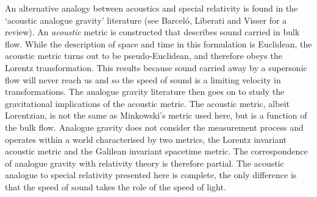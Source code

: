 \documentclass[10pt, fleqn,final,showtrims,oldfontcommands, article,a4paper,oneside]{memoir} %
\begin{document}
An alternative  analogy between acoustics and special relativity is found in the `acoustic analogue gravity' literature (see Barcel{\'o}, Liberati and Visser\cite{Barcelo2005} for a review).
An {\em acoustic} metric is constructed that describes sound carried in bulk flow.
While the description of space and time in this formulation is Euclidean, the acoustic metric turns out to be pseudo-Euclidean,
and therefore obeys the Lorentz transformation.
This results because  sound carried away by a supersonic flow will never reach us
and so the speed of sound is a limiting velocity in transformations.
The analogue gravity literature then goes on to study the gravitational implications of the acoustic metric.
The acoustic metric, albeit Lorentzian, is not the same as Minkowski's metric used here, 
but is a function of the bulk flow.
Analogue gravity does not consider the measurement process and  operates within a world characterised by two metrics, 
the Lorentz invariant acoustic metric
 and the Galilean invariant spacetime  metric.
The correspondence of analogue gravity with relativity theory is therefore partial.
The acoustic analogue to special relativity presented here is complete,
the only difference is that the speed of sound takes the role of the speed of light.






\end{document}
